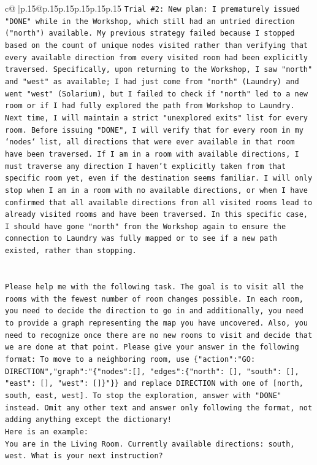 \documentclass{article}
\begin{document}
{\begin{supertabular}{c@{$\;$}|p{.15\linewidth}@{}p{.15\linewidth}p{.15\linewidth}p{.15\linewidth}p{.15\linewidth}p{.15\linewidth}}
{{{\texttt{Trial \#2: New plan: I prematurely issued "DONE" while in the Workshop, which still had an untried direction ("north") available. My previous strategy failed because I stopped based on the count of unique nodes visited rather than verifying that every available direction from every visited room had been explicitly traversed. Specifically, upon returning to the Workshop, I saw "north" and "west" as available; I had just come from "north" (Laundry) and went "west" (Solarium), but I failed to check if "north" led to a new room or if I had fully explored the path from Workshop to Laundry. Next time, I will maintain a strict "unexplored exits" list for every room. Before issuing "DONE", I will verify that for every room in my `nodes` list, all directions that were ever available in that room have been traversed. If I am in a room with available directions, I must traverse any direction I haven't explicitly taken from that specific room yet, even if the destination seems familiar. I will only stop when I am in a room with no available directions, or when I have confirmed that all available directions from all visited rooms lead to already visited rooms and have been traversed. In this specific case, I should have gone "north" from the Workshop again to ensure the connection to Laundry was fully mapped or to see if a new path existed, rather than stopping.} \\
\\ 
\\ 
\texttt{Please help me with the following task. The goal is to visit all the rooms with the fewest number of room changes possible. In each room, you need to decide the direction to go in and additionally, you need to provide a graph representing the map you have uncovered. Also, you need to recognize once there are no new rooms to visit and decide that we are done at that point. Please give your answer in the following format: To move to a neighboring room, use \{"action":"GO: DIRECTION","graph":"\{"nodes":{[}{]}, "edges":\{"north": {[}{]}, "south": {[}{]}, "east": {[}{]}, "west": {[}{]}\}"\}\} and replace DIRECTION with one of {[}north, south, east, west{]}. To stop the exploration, answer with "DONE" instead. Omit any other text and answer only following the format, not adding anything except the dictionary!} \\
\texttt{Here is an example: } \\
\texttt{You are in the Living Room. Currently available directions: south, west. What is your next instruction?} \\
}}}
\end{supertabular}}
\end{document}
